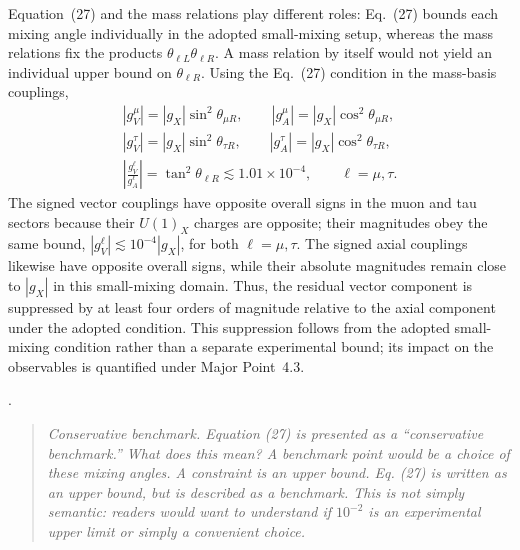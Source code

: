 \documentclass[12pt,a4paper]{article}
\begin{document}
Equation~(27) and the mass relations play different roles: Eq.~(27) bounds each mixing angle individually in the adopted small-mixing setup, whereas the mass relations fix the products \(\theta_{\ell L}\theta_{\ell R}\). A mass relation by itself would not yield an individual upper bound on \(\theta_{\ell R}\). Using the Eq.~(27) condition in the mass-basis couplings,
\[
\begin{gathered}
|g_V^\mu|=|g_X|\sin^2\theta_{\mu R},\qquad
|g_A^\mu|=|g_X|\cos^2\theta_{\mu R},\\
|g_V^\tau|=|g_X|\sin^2\theta_{\tau R},\qquad
|g_A^\tau|=|g_X|\cos^2\theta_{\tau R},\\
\left|\frac{g_V^\ell}{g_A^\ell}\right|
=\tan^2\theta_{\ell R}\lesssim1.01\times10^{-4},
\qquad \ell=\mu,\tau.
\end{gathered}
\]
The signed vector couplings have opposite overall signs in the muon and tau sectors because their \(U(1)_X\) charges are opposite; their magnitudes obey the same bound, \(|g_V^\ell|\lesssim10^{-4}|g_X|\), for both \(\ell=\mu,\tau\). The signed axial couplings likewise have opposite overall signs, while their absolute magnitudes remain close to \(|g_X|\) in this small-mixing domain. Thus, the residual vector component is suppressed by at least four orders of magnitude relative to the axial component under the adopted condition. This suppression follows from the adopted small-mixing condition rather than a separate experimental bound; its impact on the observables is quantified under Major Point~4.3.

\medskip
{}.
\begin{quote}\itshape
Conservative benchmark. Equation (27) is presented as a ``conservative benchmark.'' What does this mean? A benchmark point would be a choice of these mixing angles. A constraint is an upper bound. Eq. (27) is written as an upper bound, but is described as a benchmark. This is not simply semantic: readers would want to understand if \(10^{-2}\) is an experimental upper limit or simply a convenient choice.
\end{quote}
\end{document}
